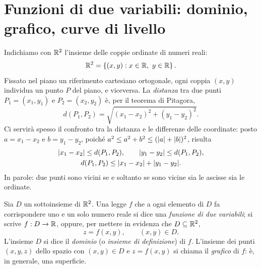 \section{Funzioni di due variabili: dominio, grafico, curve di livello}
\label{sec:due-variabili}

Indichiamo con $\mathbb{R}^{2}$ l'insieme delle coppie ordinate di numeri reali:
\begin{equation}\label{eq:R2}
  \mathbb{R}^{2}=\left\{ (x,y) : x\in\mathbb{R},\ y\in\mathbb{R} \right\}.
\end{equation}
Fissato nel piano un riferimento cartesiano ortogonale, ogni coppia $(x,y)$ individua un
punto $P$ del piano, e viceversa. La \emph{distanza} tra due punti $P_{1}=(x_{1},y_{1})$ e
$P_{2}=(x_{2},y_{2})$ è, per il teorema di Pitagora,
\begin{equation}\label{eq:distanza}
  d(P_{1},P_{2})=\sqrt{(x_{1}-x_{2})^{2}+(y_{1}-y_{2})^{2}} .
\end{equation}
Ci servirà spesso il confronto tra la distanza e le differenze delle coordinate: posto
$a=x_{1}-x_{2}$ e $b=y_{1}-y_{2}$, poiché $a^{2}\le a^{2}+b^{2}\le(\lvert a\rvert+\lvert b\rvert)^{2}$,
risulta
\begin{equation}\label{eq:distanza-componenti}
\begin{gathered}
  \lvert x_{1}-x_{2}\rvert\le d(P_{1},P_{2}), \qquad \lvert y_{1}-y_{2}\rvert\le d(P_{1},P_{2}),\\
  d(P_{1},P_{2})\le\lvert x_{1}-x_{2}\rvert+\lvert y_{1}-y_{2}\rvert .
\end{gathered}
\end{equation}
In parole: due punti sono vicini se e soltanto se sono vicine sia le ascisse sia le
ordinate.

\begin{definizione}\label{def:funzione-due-variabili}
Sia $D$ un sottoinsieme di $\mathbb{R}^{2}$. Una legge $f$ che a ogni elemento di $D$ fa
corrispondere uno e un solo numero reale si dice una \emph{funzione di due variabili}; si
scrive $f:D\to\mathbb{R}$, oppure, per mettere in evidenza che $D\subseteq\mathbb{R}^{2}$,
\begin{equation}\label{eq:z-f-xy}
  z=f(x,y), \qquad (x,y)\in D .
\end{equation}
L'insieme $D$ si dice il \emph{dominio} (o \emph{insieme di definizione}) di $f$.
L'insieme dei punti $(x,y,z)$ dello spazio con $(x,y)\in D$ e $z=f(x,y)$ si chiama il
\emph{grafico} di $f$: è, in generale, una superficie.
\end{definizione}

